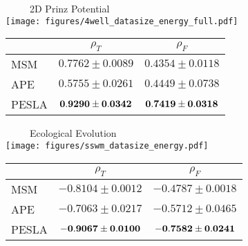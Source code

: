 \begin{minipage}{0.49\textwidth}
    \centering
    \footnotesize
    \subcaption{~~~~~~~~~~~~~~~~~~~~~~~~~~~~~~~~~~~~~~~~~~~~~~~~~~~~~~~~~~~~~~~~~~~~~~~~~~~~~~~~~~~~~~~~~~~~~~~~~~~~~~~~~~~~~~~~~~~~~~~~~~~~~~~~}\label{fig:4well_energy_data}
    
    ~~~~~2D Prinz Potential\\
    \texttt{[image: figures/4well\_datasize\_energy\_full.pdf]}
    
    \vspace{0.2cm} %
    \setlength{\tabcolsep}{4pt} %
    \renewcommand{\arraystretch}{1.2} %
    \fontsize{8}{10}\selectfont %
    \begin{tabularx}{0.9\textwidth}{l|cc} %
        \hline
        & $\rho_T$ & $\rho_F$ \\
        \hline
        MSM & $0.7762\pm0.0089$ &  $0.4354\pm0.0118$   \\
        APE & $0.5755\pm0.0261$ & $0.4449\pm0.0738$  \\
        PESLA & $\bf{0.9290\pm0.0342}$ &  $\bf{0.7419\pm0.0318}$ \\
        \hline           
    \end{tabularx}
\end{minipage}
\begin{minipage}{0.49\textwidth}
    \centering
    \footnotesize
    \subcaption{~~~~~~~~~~~~~~~~~~~~~~~~~~~~~~~~~~~~~~~~~~~~~~~~~~~~~~~~~~~~~~~~~~~~~~~~~~~~~~~~~~~~~~~~~~~~~~~~~~~~~~~~~~~~~~~~~~~~~~~~~~~~~~~~}\label{fig:sswm_energy_data}
    
    ~~~~~Ecological Evolution\\
    \texttt{[image: figures/sswm\_datasize\_energy.pdf]}
    
    \vspace{0.2cm} %
    \setlength{\tabcolsep}{4pt} %
    \renewcommand{\arraystretch}{1.2} %
    \fontsize{8}{10}\selectfont %
    \begin{tabularx}{0.97\textwidth}{l|cc} %
        \hline
        & $\rho_T$ & $\rho_F$ \\
        \hline
        MSM & $-0.8104\pm0.0012$ & $-0.4787\pm0.0018$  \\
        APE & $-0.7063\pm0.0217$ & $-0.5712\pm0.0465$ \\
        PESLA & $\bf{-0.9067\pm0.0100}$ & $\bf{-0.7582\pm0.0241}$ \\
        \hline           
    \end{tabularx}
\end{minipage}
